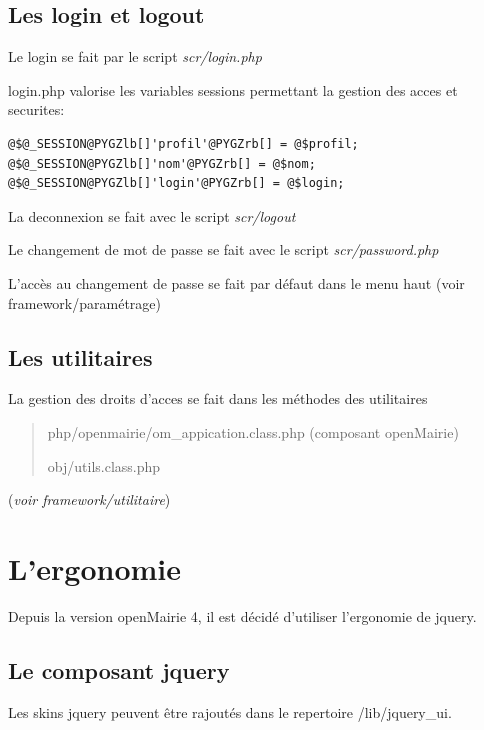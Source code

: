 \documentclass[letterpaper,10pt,french]{manual}
\begin{document}
\subsection{Les login et logout}

Le login se fait par le script \emph{scr/login.php}

login.php valorise les variables sessions  permettant la gestion des acces et securites:

\begin{Verbatim}[commandchars=@\[\]]
@$@_SESSION@PYGZlb[]'profil'@PYGZrb[] = @$profil;
@$@_SESSION@PYGZlb[]'nom'@PYGZrb[] = @$nom;
@$@_SESSION@PYGZlb[]'login'@PYGZrb[] = @$login;
\end{Verbatim}

La deconnexion se fait avec le script  \emph{scr/logout}

Le changement de mot de passe se fait avec le script  \emph{scr/password.php}

L'accès au changement de passe se fait par défaut dans le menu haut
(voir framework/paramétrage)


\subsection{Les utilitaires}

La gestion des droits d'acces se fait dans les méthodes des utilitaires
\begin{quote}

php/openmairie/om\_appication.class.php (composant openMairie)

obj/utils.class.php
\end{quote}

(\emph{voir framework/utilitaire})

\resetcurrentobjects
\hypertarget{--doc-framework/ergonomie}{}

\hypertarget{ergonomie}{}\section{L'ergonomie}

Depuis la version openMairie 4, il est décidé d'utiliser l'ergonomie de jquery.


\subsection{Le composant jquery}

Les skins jquery peuvent être rajoutés dans le repertoire /lib/jquery\_ui.
\end{document}
